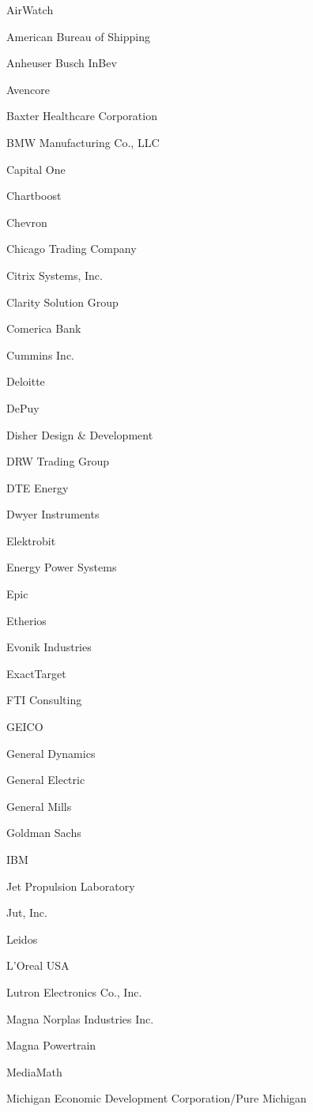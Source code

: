 \documentclass[twoside]{article}
\begin{document}
\begin{center}
\begin{multicols}{5}
\begin{FlushLeft}
\begin{compactitem}
\item AirWatch
\item American Bureau of Shipping
\item Anheuser Busch InBev
\item Avencore
\item Baxter Healthcare Corporation
\item BMW Manufacturing Co., LLC
\item Capital One
\item Chartboost
\item Chevron
\item Chicago Trading Company
\item Citrix Systems, Inc.
\item Clarity Solution Group
\item Comerica Bank
\item Cummins Inc.
\item Deloitte
\item DePuy
\item Disher Design \& Development
\item DRW Trading Group
\item DTE Energy
\item Dwyer Instruments
\item Elektrobit
\item Energy Power Systems
\item Epic
\item Etherios
\item Evonik Industries
\item ExactTarget
\item FTI Consulting
\item GEICO
\item General Dynamics
\item General Electric
\item General Mills
\item Goldman Sachs
\item IBM
\item Jet Propulsion Laboratory
\item Jut, Inc.
\item Leidos
\item L'Oreal USA
\item Lutron Electronics Co., Inc.
\item Magna Norplas Industries Inc.
\item Magna Powertrain
\item MediaMath
\item Michigan Economic Development Corporation/Pure Michigan

\end{compactitem}
\end{FlushLeft}
\end{multicols}
\end{center}
\end{document}
